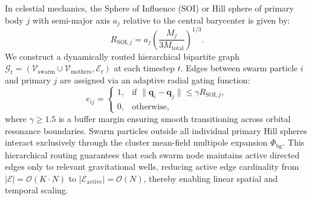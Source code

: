 \documentclass[preprint,12pt,3p]{elsarticle}
\begin{document}
In celestial mechanics, the Sphere of Influence (SOI) or Hill sphere of primary body $j$ with semi-major axis $a_j$ relative to the central barycenter is given by:
\begin{equation}
R_{\mathrm{SOI}, j} = a_j \left( \frac{M_j}{3 M_{\mathrm{total}}} \right)^{1/3}.
\label{eq:hill_radius}
\end{equation}
We construct a dynamically routed hierarchical bipartite graph $\mathcal{G}_t = (\mathcal{V}_{\mathrm{swarm}} \cup \mathcal{V}_{\mathrm{mothers}}, \mathcal{E}_t)$ at each timestep $t$. Edges between swarm particle $i$ and primary $j$ are assigned via an adaptive radial gating function:
\begin{equation}
e_{ij} = \begin{cases}
1, & \text{if } \|\bm{q}_i - \bm{q}_j\| \le \gamma R_{\mathrm{SOI}, j}, \\
0, & \text{otherwise},
\end{cases}
\label{eq:edge_gating}
\end{equation}
where $\gamma \ge 1.5$ is a buffer margin ensuring smooth transitioning across orbital resonance boundaries. Swarm particles outside all individual primary Hill spheres interact exclusively through the cluster mean-field multipole expansion $\Phi_{\mathrm{bg}}$. This hierarchical routing guarantees that each swarm node maintains active directed edges only to relevant gravitational wells, reducing active edge cardinality from $|\mathcal{E}| = \mathcal{O}(K \cdot N)$ to $|\mathcal{E}_{\mathrm{active}}| = \mathcal{O}(N)$, thereby enabling linear spatial and temporal scaling.
\end{document}
